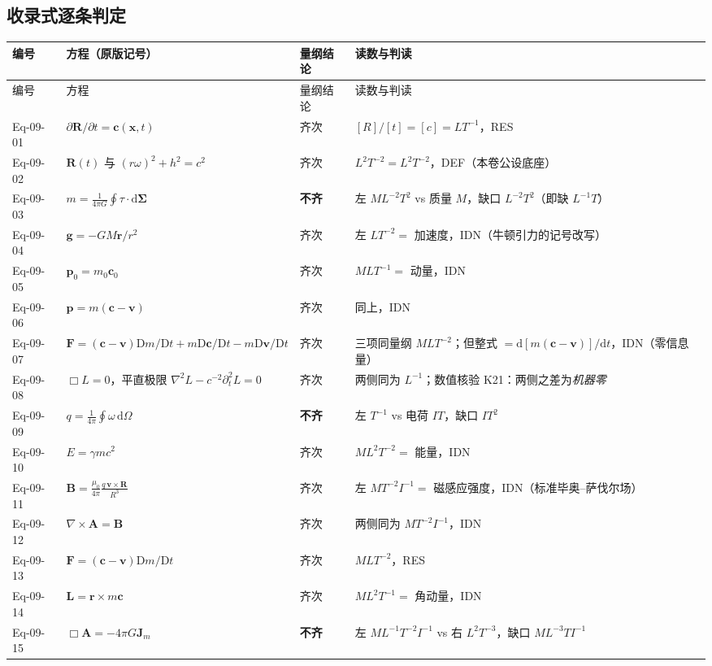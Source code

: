 \documentclass[UTF8,fontset=fandol,11pt]{ctexart}
\newcommand{\dd}{\mathrm{d}}
\newcommand{\DD}{\mathrm{D}}
\newcommand{\bx}{\boldsymbol}
\begin{document}
\subsection{收录式逐条判定}
\begin{longtable}{p{1.5cm}p{5.4cm}p{3.0cm}p{6.0cm}}
\toprule
编号 & 方程（原版记号） & 量纲结论 & 读数与判读 \\
\midrule
\endfirsthead
\toprule
编号 & 方程 & 量纲结论 & 读数与判读 \\
\midrule
\endhead
Eq-09-01 & $\partial\bx R/\partial t=\bx c(\bx x,t)$ & 齐次 & $[R]/[t]=[c]=LT^{-1}$，RES \\
Eq-09-02 & $\bx R(t)$ 与 $(r\omega)^2+h^2=c^2$ & 齐次 & $L^2T^{-2}=L^2T^{-2}$，DEF（本卷公设底座） \\
Eq-09-03 & $m=\frac{1}{4\pi G}\oint\tau\cdot\dd\bx\Sigma$ & \textbf{不齐} & 左 $M L^{-2}T^{2}$ vs 质量 $M$，缺口 $L^{-2}T^{2}$（即缺 $L^{-1}T$） \\
Eq-09-04 & $\bx g=-GM\bx r/r^2$ & 齐次 & 左 $LT^{-2}=$ 加速度，IDN（牛顿引力的记号改写） \\
Eq-09-05 & $\bx p_0=m_0\bx c_0$ & 齐次 & $M L T^{-1}=$ 动量，IDN \\
Eq-09-06 & $\bx p=m(\bx c-\bx v)$ & 齐次 & 同上，IDN \\
Eq-09-07 & $\bx F=(\bx c-\bx v)\DD m/\DD t+m\DD\bx c/\DD t-m\DD\bx v/\DD t$ & 齐次 & 三项同量纲 $MLT^{-2}$；但整式 $=\dd[m(\bx c-\bx v)]/\dd t$，IDN（零信息量） \\
Eq-09-08 & $\Box L=0$，平直极限 $\nabla^2L-c^{-2}\partial_t^2L=0$ & 齐次 & 两侧同为 $L^{-1}$；数值核验 K21：两侧之差为\emph{机器零} \\
Eq-09-09 & $q=\frac{1}{4\pi}\oint\omega\,\dd\Omega$ & \textbf{不齐} & 左 $T^{-1}$ vs 电荷 $IT$，缺口 $I T^{2}$ \\
Eq-09-10 & $E=\gamma mc^2$ & 齐次 & $ML^2T^{-2}=$ 能量，IDN \\
Eq-09-11 & $\bx B=\frac{\mu_0}{4\pi}\frac{q\,\bx v\times\bx R}{R^3}$ & 齐次 & 左 $MT^{-2}I^{-1}=$ 磁感应强度，IDN（标准毕奥--萨伐尔场） \\
Eq-09-12 & $\nabla\times\bx A=\bx B$ & 齐次 & 两侧同为 $MT^{-2}I^{-1}$，IDN \\
Eq-09-13 & $\bx F=(\bx c-\bx v)\DD m/\DD t$ & 齐次 & $MLT^{-2}$，RES \\
Eq-09-14 & $\bx L=\bx r\times m\bx c$ & 齐次 & $ML^2T^{-1}=$ 角动量，IDN \\
Eq-09-15 & $\Box\bx A=-4\pi G\bx J_m$ & \textbf{不齐} & 左 $M L^{-1}T^{-2}I^{-1}$ vs 右 $L^2T^{-3}$，缺口 $M L^{-3}T I^{-1}$ \\

\end{longtable}
\end{document}
